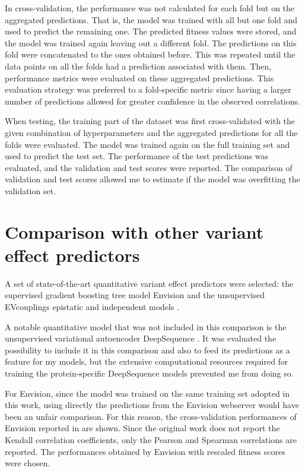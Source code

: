 In cross-validation, the performance was not calculated for each fold but on the aggregated predictions.
That is, the model was trained with all but one fold and used to predict the remaining one.
The predicted fitness values were stored, and the model was trained again leaving out a different fold.
The predictions on this fold were concatenated to the ones obtained before.
This was repeated until the data points on all the folds had a prediction associated with them.
Then, performance metrics were evaluated on these aggregated predictions.
This evaluation strategy was preferred to a fold-specific metric since having a larger number of predictions allowed for greater confidence in the observed correlations.

When testing, the training part of the dataset was first cross-validated with the given combination of hyperparameters and the aggregated predictions for all the folds were evaluated.
The model was trained again on the full training set and used to predict the test set.
The performance of the test predictions was evaluated, and the validation and test scores were reported.
The comparison of validation and test scores allowed me to estimate if the model was overfitting the validation set.

\section{Comparison with other variant effect predictors}
A set of state-of-the-art quantitative variant effect predictors were selected: the supervised gradient boosting tree model Envision \parencite{Gray2018} and the unsupervised EVcouplings epistatic and independent models \parencite{Hopf2018}.

A notable quantitative model that was not included in this comparison is the unsupervised variational autoencoder DeepSequence \parencite{Riesselman2018}.
It was evaluated the possibility to include it in this comparison and also to feed its predictions as a feature for my models, but the extensive computational resources required for training the protein-specific DeepSequence models prevented me from doing so.

For Envision, since the model was trained on the same training set adopted in this work, using directly the predictions from the Envision webserver would have been an unfair comparison.
For this reason, the cross-validation performances of Envision reported in \textcite{Gray2018} are shown.
Since the original work does not report the Kendall correlation coefficients, only the Pearson and Spearman correlations are reported.
The performances obtained by Envision with rescaled fitness scores were chosen.

